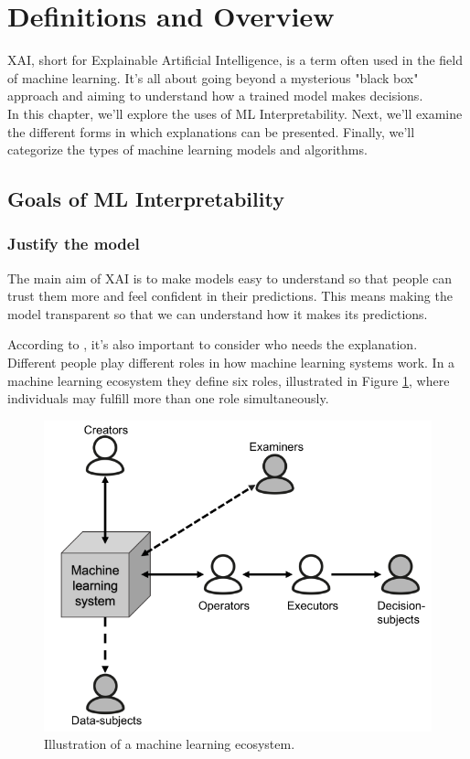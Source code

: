 
\newpage
\section{Definitions and Overview}\label{sec:2}

XAI, short for Explainable Artificial Intelligence, is a term often used in the field of machine learning. It's all about going beyond a mysterious "black box" approach and aiming to understand how a trained model makes decisions.\\
In this chapter, we'll explore the uses of ML Interpretability. Next, we'll examine the different forms in which explanations can be presented. Finally, we'll categorize the types of machine learning models and algorithms.

\subsection{Goals of ML Interpretability}\label{sec:goals}

\subsubsection*{Justify the model} 
The main aim of XAI is to make models easy to understand so that people can trust them more and feel confident in their predictions. This means making the model transparent so that we can understand how it makes its predictions.

According to \cite{InterpretableToWhom}, it's also important to consider who needs the explanation. Different people play different roles in how machine learning systems work.
In a machine learning ecosystem they define six roles, illustrated in Figure \ref{fig:InterpretableToWhom}, where individuals may fulfill more than one role simultaneously.

\begin{figure}[H]
    \centering
    \includegraphics[width=0.6\linewidth]{pics/ill_ml_justify.png}
    \caption{Illustration of a machine learning ecosystem.\cite{InterpretableToWhom}}
    \label{fig:InterpretableToWhom}
\end{figure}

